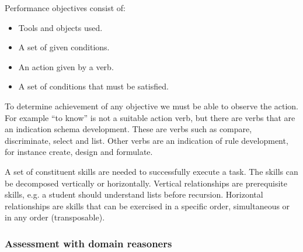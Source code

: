 \label{c02:objectives}
Performance objectives consist of:
\begin{itemize}
\item Tools and objects used.
\item A set of given conditions.
\item An action given by a verb.
\item A set of conditions that must be satisfied.
\end{itemize}

To determine achievement of any objective we must be able to observe the action.
For example ``to know'' is not a suitable action verb, but there are verbs that are an indication schema development.
These are verbs such as compare, discriminate, select and list.
Other verbs are an indication of rule development, for instance create, design and formulate.

A set of constituent skills are needed to successfully execute a task.  
The skills can be decomposed vertically or horizontally.
Vertical relationships are prerequisite skills, e.g. a student should understand lists before recursion.
Horizontal relationships are skills that can be exercised in a specific order, simultaneous or in any order (transposable). 
 
\subsubsection{Assessment with domain reasoners}

